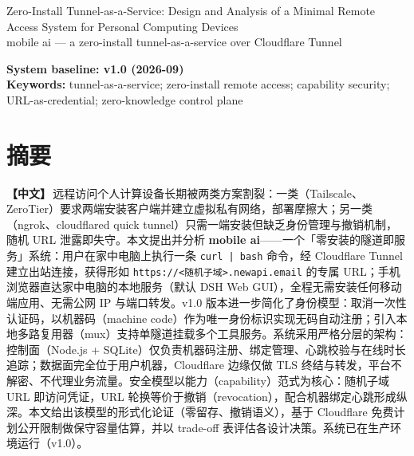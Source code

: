\documentclass[10pt,a4paper]{article}
\newcommand{\sys}{mobile ai}
\begin{document}
\begin{center}
{\LARGE Zero-Install Tunnel-as-a-Service: Design and Analysis of a Minimal Remote Access System for Personal Computing Devices\\[0.6em]}
{\large mobile ai --- a zero-install tunnel-as-a-service over Cloudflare Tunnel}
\end{center}

\vspace{0.8em}
\noindent\textbf{System baseline: v1.0 (2026-09)}\\[0.3em]
\noindent\textbf{Keywords:} tunnel-as-a-service; zero-install remote access; capability security; URL-as-credential; zero-knowledge control plane

\section*{摘要}

\noindent\textbf{【中文】}\,远程访问个人计算设备长期被两类方案割裂：一类（Tailscale、ZeroTier）要求两端安装客户端并建立虚拟私有网络，部署摩擦大；另一类（ngrok、cloudflared quick tunnel）只需一端安装但缺乏身份管理与撤销机制，随机 URL 泄露即失守。本文提出并分析 \textbf{\sys}——一个「零安装的隧道即服务」系统：用户在家中电脑上执行一条 \texttt{curl\ | bash} 命令，经 Cloudflare Tunnel 建立出站连接，获得形如 \texttt{https://<随机子域>.newapi.email} 的专属 URL；手机浏览器直达家中电脑的本地服务（默认 DSH Web GUI），全程无需安装任何移动端应用、无需公网 IP 与端口转发。v1.0 版本进一步简化了身份模型：取消一次性认证码，以机器码（machine code）作为唯一身份标识实现无码自动注册；引入本地多路复用器（mux）支持单隧道挂载多个工具服务。系统采用严格分层的架构：控制面（Node.js + SQLite）仅负责机器码注册、绑定管理、心跳校验与在线时长追踪；数据面完全位于用户机器，Cloudflare 边缘仅做 TLS 终结与转发，平台不解密、不代理业务流量。安全模型以能力（capability）范式为核心：随机子域 URL 即访问凭证，URL 轮换等价于撤销（revocation），配合机器绑定心跳形成纵深。本文给出该模型的形式化论证（零留存、撤销语义），基于 Cloudflare 免费计划公开限制做保守容量估算，并以 trade-off 表评估各设计决策。系统已在生产环境运行（v1.0）。
\end{document}
